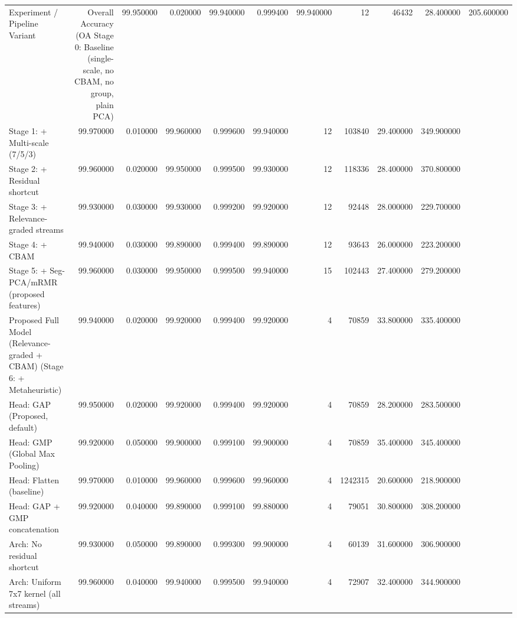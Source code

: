 \begin{tabular}{lrrrrrrrrr}
\toprule
Experiment / Pipeline Variant & Overall Accuracy (OA %
\midrule
Stage 0: Baseline (single-scale, no CBAM, no group, plain PCA) & 99.950000 & 0.020000 & 99.940000 & 0.999400 & 99.940000 & 12 & 46432 & 28.400000 & 205.600000 \\
Stage 1: + Multi-scale (7/5/3) & 99.970000 & 0.010000 & 99.960000 & 0.999600 & 99.940000 & 12 & 103840 & 29.400000 & 349.900000 \\
Stage 2: + Residual shortcut & 99.960000 & 0.020000 & 99.950000 & 0.999500 & 99.930000 & 12 & 118336 & 28.400000 & 370.800000 \\
Stage 3: + Relevance-graded streams & 99.930000 & 0.030000 & 99.930000 & 0.999200 & 99.920000 & 12 & 92448 & 28.000000 & 229.700000 \\
Stage 4: + CBAM & 99.940000 & 0.030000 & 99.890000 & 0.999400 & 99.890000 & 12 & 93643 & 26.000000 & 223.200000 \\
Stage 5: + Seg-PCA/mRMR (proposed features) & 99.960000 & 0.030000 & 99.950000 & 0.999500 & 99.940000 & 15 & 102443 & 27.400000 & 279.200000 \\
Proposed Full Model (Relevance-graded + CBAM) (Stage 6: + Metaheuristic) & 99.940000 & 0.020000 & 99.920000 & 0.999400 & 99.920000 & 4 & 70859 & 33.800000 & 335.400000 \\
Head: GAP (Proposed, default) & 99.950000 & 0.020000 & 99.920000 & 0.999400 & 99.920000 & 4 & 70859 & 28.200000 & 283.500000 \\
Head: GMP (Global Max Pooling) & 99.920000 & 0.050000 & 99.900000 & 0.999100 & 99.900000 & 4 & 70859 & 35.400000 & 345.400000 \\
Head: Flatten (baseline) & 99.970000 & 0.010000 & 99.960000 & 0.999600 & 99.960000 & 4 & 1242315 & 20.600000 & 218.900000 \\
Head: GAP + GMP concatenation & 99.920000 & 0.040000 & 99.890000 & 0.999100 & 99.880000 & 4 & 79051 & 30.800000 & 308.200000 \\
Arch: No residual shortcut & 99.930000 & 0.050000 & 99.890000 & 0.999300 & 99.900000 & 4 & 60139 & 31.600000 & 306.900000 \\
Arch: Uniform 7x7 kernel (all streams) & 99.960000 & 0.040000 & 99.940000 & 0.999500 & 99.940000 & 4 & 72907 & 32.400000 & 344.900000 \\

\end{tabular}
